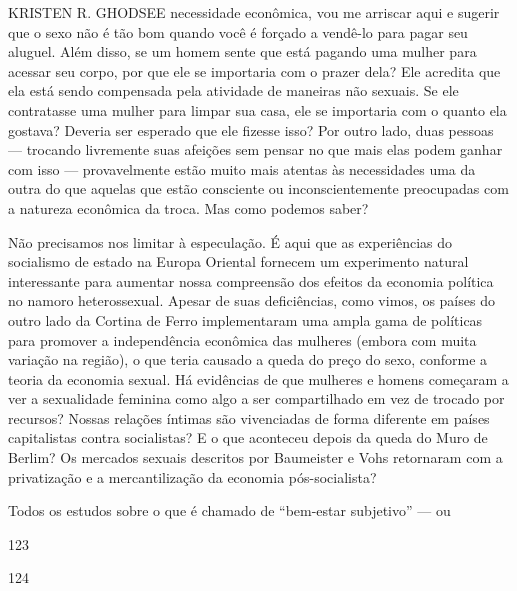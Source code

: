  \par 
KRISTEN R. GHODSEE necessidade econômica, vou me arriscar aqui e sugerir que o sexo não é tão bom quando você é forçado a vendê-lo para pagar seu aluguel. Além disso, se um homem sente que está pagando uma mulher para acessar seu corpo, por que ele se importaria com o prazer dela? Ele acredita que ela está sendo compensada pela atividade de maneiras não sexuais. Se ele contratasse uma mulher para limpar sua casa, ele se importaria com o quanto ela gostava? Deveria ser esperado que ele fizesse isso? Por outro lado, duas pessoas — trocando livremente suas afeições sem pensar no que mais elas podem ganhar com isso — provavelmente estão muito mais atentas às necessidades uma da outra do que aquelas que estão consciente ou inconscientemente preocupadas com a natureza econômica da troca. Mas como podemos saber?
 \par 
Não precisamos nos limitar à especulação. É aqui que as experiências do socialismo de estado na Europa Oriental fornecem um experimento natural interessante para aumentar nossa compreensão dos efeitos da economia política no namoro heterossexual. Apesar de suas deficiências, como vimos, os países do outro lado da Cortina de Ferro implementaram uma ampla gama de políticas para promover a independência econômica das mulheres (embora com muita variação na região), o que teria causado a queda do preço do sexo, conforme a teoria da economia sexual. Há evidências de que mulheres e homens começaram a ver a sexualidade feminina como algo a ser compartilhado em vez de trocado por recursos? Nossas relações íntimas são vivenciadas de forma diferente em países capitalistas contra socialistas? E o que aconteceu depois da queda do Muro de Berlim? Os mercados sexuais descritos por Baumeister e Vohs retornaram com a privatização e a mercantilização da economia pós-socialista?
 \par 
Todos os estudos sobre o que é chamado de “bem-estar subjetivo” — ou
 \par 
123
 \par 
124
 \par 
